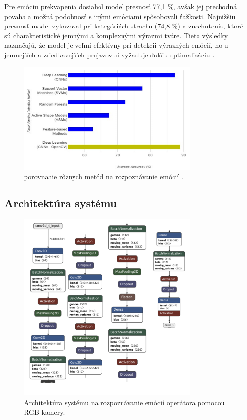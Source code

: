 Pre emóciu prekvapenia dosiahol model presnosť 77,1 \%, avšak jej prechodná povaha a možná podobnosť s inými emóciami spôsobovali ťažkosti. Najnižšiu presnosť 
model vykazoval pri kategóriách strachu (74,8 \%) a znechutenia, ktoré sú charakteristické jemnými a komplexnými výrazmi tváre. Tieto výsledky naznačujú,
že model je veľmi efektívny pri detekcii výrazných emócií, no u jemnejších a zriedkavejších prejavov si vyžaduje ďalšiu optimalizáciu \cite{inProceedings02}.
\begin{figure}[!htpb]
    \centering
    \includegraphics[width=0.8\textwidth]{img/comparation.png}
    \caption{porovnanie rôznych metód na rozpoznávanie emócií \cite{inProceedings02}.}
    \label{fig:comparation}
\end{figure}
\newpage
\subsection{Architektúra systému}
\begin{figure}[!htpb]
    \centering
    \includegraphics[width=0.8\textwidth]{img/architecture.png}
    \caption{Architektúra systému na rozpoznávanie emócií operátora pomocou RGB kamery.} 
    \label{fig:architecture}
\end{figure}
\newpage

